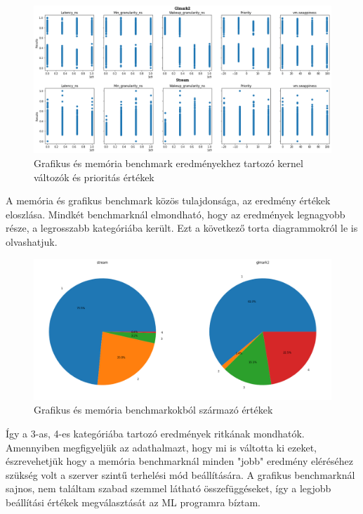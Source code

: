 \begin{figure}[h!]
\centering
\includegraphics[scale=0.35]{images/graphicsAndMemoryBenchmarkValue.png}
\caption{Grafikus és memória benchmark eredményekhez tartozó kernel változók és prioritás értékek}
\label{fig:GraphicsAndMemoryParameters}
\end{figure}

A memória és grafikus benchmark közös tulajdonsága, az eredmény értékek eloszlása. Mindkét benchmarknál elmondható, hogy az eredmények legnagyobb része, a legrosszabb kategóriába került.
Ezt a következő torta diagrammokról le is olvashatjuk.

\begin{figure}[h!]
\centering
\includegraphics[scale=0.3]{images/graphicsAndMemoryBenchmarkChart.png}
\caption{Grafikus és memória benchmarkokból származó értékek}
\label{fig:GraphicsAndMemoryChart}
\end{figure}

Így a 3-as, 4-es kategóriába tartozó eredmények ritkának mondhatók. Amennyiben megfigyeljük az adathalmazt, hogy mi is váltotta ki ezeket, észrevehetjük hogy a memória benchmarknál  minden "jobb" eredmény eléréséhez szükség volt a szerver szintű terhelési mód beállítására.
A grafikus benchmarknál sajnos, nem találtam szabad szemmel látható összefüggéseket, így a legjobb beállítási értékek megválasztását az ML programra bíztam.

